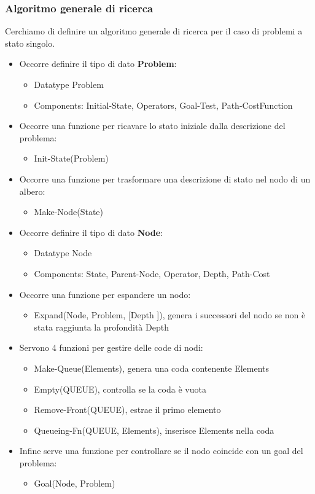 \documentclass[../main.tex]{subfiles}
\begin{document}
	\subsubsection{Algoritmo generale di ricerca}
	Cerchiamo di definire un algoritmo generale di ricerca per il caso di problemi a stato singolo.
	\begin{itemize}
		\item Occorre definire il tipo di dato \textbf{Problem}:
		\begin{itemize}
			\item Datatype Problem
			\item Components: Initial-State, Operators, Goal-Test, Path-CostFunction
		\end{itemize}
		 \item Occorre una funzione per ricavare lo stato iniziale dalla descrizione del problema:
		\begin{itemize}
			\item Init-State(Problem)
		\end{itemize}
		\item Occorre una funzione per trasformare una descrizione di stato nel nodo di un albero:
		\begin{itemize}
			\item  Make-Node(State)
		\end{itemize}
		\item  Occorre definire il tipo di dato \textbf{Node}:
		\begin{itemize}
			\item Datatype Node
			\item  Components: State, Parent-Node, Operator, Depth, Path-Cost
		\end{itemize}
		\item Occorre una funzione per espandere un nodo:
		\begin{itemize}
			\item Expand(Node, Problem, [Depth ]), genera i successori del nodo se non è stata raggiunta la profondità Depth
		\end{itemize}
		\item Servono 4 funzioni per gestire delle code di nodi:
		\begin{itemize}
			\item Make-Queue(Elements), genera una coda contenente Elements
			\item Empty(QUEUE), controlla se la coda è vuota
			\item Remove-Front(QUEUE), estrae il primo elemento
			\item Queueing-Fn(QUEUE, Elements), inserisce Elements nella coda
		\end{itemize}
		\item Infine serve una funzione per controllare se il nodo coincide con un goal del problema:
		\begin{itemize}
			\item Goal(Node, Problem)
		\end{itemize}
	\end{itemize}
\end{document}
